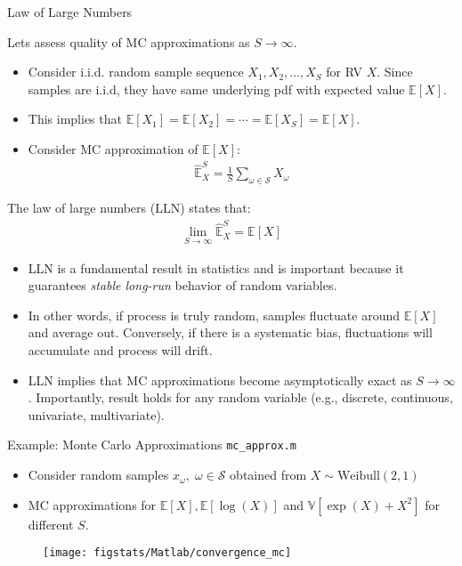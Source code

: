 \documentclass[handout,9pt]{beamer}
\begin{document}
%
\begin{frame}{Law of Large Numbers}

Lets assess quality of MC approximations as $S\to \infty$. 
\begin{itemize}
\item Consider i.i.d. random sample sequence $X_1,X_2,...,X_S$ for RV $X$. Since samples are i.i.d, they have same underlying pdf with expected value $\mathbb{E}[X]$. 
\item This implies that $\mathbb{E}[X_1]=\mathbb{E}[X_2]=\cdots=\mathbb{E}[X_S]=\mathbb{E}[X]$. 
\item Consider MC approximation of $\mathbb{E}[X]$:
\begin{align*}
\hat{\mathbb{E}}_X^S=\frac{1}{S}\sum_{\omega \in \mathcal{S}}X_\omega
\end{align*}
\end{itemize}
\begin{block}{}
The law of large numbers (LLN) states that:
\begin{align*}
\lim_{S\to \infty}\hat{\mathbb{E}}_X^S=\mathbb{E}[X]
\end{align*}
\end{block}
\begin{itemize}
\item LLN is a fundamental result in statistics and is important because it guarantees {\em stable long-run} behavior of random variables.  

\item In other words, if process is truly random, samples fluctuate around $\mathbb{E}[X]$ and average out.  Conversely, if there is a systematic bias, fluctuations will accumulate and process will drift. 

\item LLN implies that MC approximations become asymptotically exact as $S\to \infty$. Importantly, result holds for any random variable (e.g., discrete, continuous, univariate, multivariate). 
\end{itemize}

\end{frame}

%
\begin{frame}{Example: Monte Carlo Approximations \footnotesize{\texttt{mc\_approx.m}}}

\begin{itemize}
\setlength{\itemsep}{10pt}
\item Consider random samples $x_\omega,\; \omega \in \mathcal{S}$ obtained from $X\sim \textrm{Weibull}(2,1)$
\item MC approximations for $\mathbb{E}[X],\mathbb{E}[\log(X)]$ and $\mathbb{V}[\exp(X)+X^2]$  for different $S$.
\end{itemize}
\begin{figure}[!htb]
    \centering
	\texttt{[image: figstats/Matlab/convergence\_mc]}
\end{figure}


\end{frame}
\end{document}
